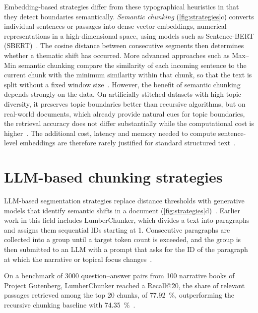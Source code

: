 Embedding-based strategies differ from these typographical heuristics in that they detect
boundaries semantically. \emph{Semantic chunking} (\cref{fig:strategies}c) converts individual sentences or passages
into dense vector embeddings, numerical representations in a high-dimensional space,
using models such as Sentence-BERT (SBERT)~\cite{reimers2019sbert}. The cosine distance
between consecutive segments then determines whether a thematic shift has occurred. More
advanced approaches such as Max--Min semantic chunking compare the similarity of each
incoming sentence to the current chunk with the minimum similarity within that chunk, so
that the text is split without a fixed window size~\cite{kiss2025maxmin,
smigielski2026chunking}. However, the benefit of semantic chunking depends strongly on the
data. On artificially stitched datasets with high topic diversity, it preserves topic
boundaries better than recursive algorithms, but on real-world documents, which already
provide natural cues for topic boundaries, the retrieval accuracy does not differ
substantially while the computational cost is higher~\cite{qu-etal-2025-semantic}. The
additional cost, latency and memory needed to compute sentence-level embeddings are
therefore rarely justified for standard structured text~\cite{qu-etal-2025-semantic}.

\section{LLM-based chunking strategies}
\label{sec:llm_chunking}

LLM-based segmentation strategies replace distance thresholds with generative models that
identify semantic shifts in a document (\cref{fig:strategies}d)~\cite{smigielski2026chunking}. Earlier work in this
field includes LumberChunker, which divides a text into paragraphs and assigns them
sequential IDs starting at 1. Consecutive paragraphs are collected into a group until a
target token count is exceeded, and the group is then submitted to an LLM with a prompt
that asks for the ID of the paragraph at which the narrative or topical focus
changes~\cite{duarte2024lumberchunker}.

On a benchmark of \num{3000} question--answer pairs from 100 narrative books of Project
Gutenberg, LumberChunker reached a Recall@20, the share of relevant passages retrieved
among the top 20 chunks, of \SI{77.92}{\percent}, outperforming the recursive chunking
baseline with \SI{74.35}{\percent}~\cite{duarte2024lumberchunker}.

